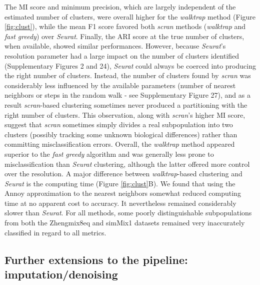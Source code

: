 \documentclass{bmcart}
\begin{document}
The MI score and minimum precision, which are largely independent of the estimated number of clusters, were overall higher for the \textit{walktrap} method (Figure \ref{fig:clust}), while the mean F1 score favored both \textit{scran} methods (\textit{walktrap} and \textit{fast greedy}) over \textit{Seurat}. Finally, the ARI score at the true number of clusters, when available, showed similar performances. However, because \textit{Seurat}'s resolution parameter had a large impact on the number of clusters identified (Supplementary Figures 2 and 24), \textit{Seurat} could always be coerced into producing the right number of clusters. Instead, the number of clusters found by \textit{scran} was considerably less influenced by the available parameters (number of nearest neighbors or steps in the random walk - see Supplementary Figure 27), and as a result \textit{scran}-based clustering sometimes never produced a partitioning with the right number of clusters. This observation, along with \textit{scran}'s higher MI score, suggest that \textit{scran} sometimes simply divides a real subpopulation into two clusters (possibly tracking some unknown biological differences) rather than committing misclassification errors. Overall, the \textit{walktrap} method appeared superior to the \textit{fast greedy} algorithm and was generally less prone to misclassification than \textit{Seurat} clustering, although the latter offered more control over the resolution. A major difference between \textit{walktrap}-based clustering and \textit{Seurat} is the computing time (Figure \ref{fig:clust}B). We found that using the Annoy approximation to the nearest neighbors somewhat reduced computing time at no apparent cost to accuracy. It nevertheless remained considerably slower than \textit{Seurat}. For all methods, some poorly distinguishable subpopulations from both the Zhengmix8eq and simMix1 datasets remained very inaccurately classified in regard to all metrics.

\subsection*{Further extensions to the pipeline: imputation/denoising}
\end{document}
